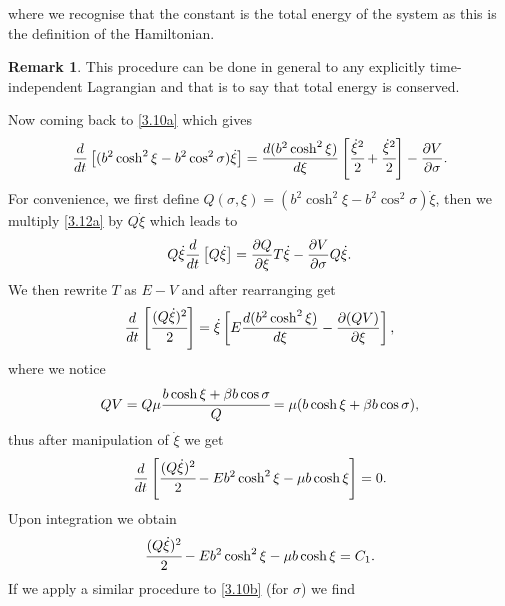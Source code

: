 \documentclass[12pt,oneside]{report}
\theoremstyle{definition}
\newtheorem{remark}{Remark}
\begin{document}
where we recognise that the constant is the total energy of the system as this is the definition of the Hamiltonian.
\begin{remark}
 This procedure can be done in general to any explicitly time-independent Lagrangian and that is to say that total energy is conserved.   
\end{remark}
Now coming back to  \autoref{3.10a} which gives
    \begin{equation}\label{3.12a}
        \displaystyle\frac{d }{d t}\left[(b^{2}\cosh^{2}{\xi}-b^{2}\cos^{2}{\sigma})\dot{\xi} \right] = \displaystyle\frac{d (b^{2}\cosh^{2}{\xi})}{d \xi} \left[\cfrac{\dot{\xi}^{2}}{2} + \cfrac{\dot{\xi}^{2}}{2}\right] - \displaystyle\frac{\partial V}{\partial \sigma} .
    \end{equation}
For convenience, we first define $ Q(\sigma,\xi) = (b^{2}\cosh^{2}{\xi}-b^{2}\cos^{2}{\sigma})\dot{\xi}$, then we multiply \autoref{3.12a} by $ Q\dot{\xi} $ which leads to
$$ Q\dot{\xi} \displaystyle\frac{d }{d t}\left[Q\dot{\xi} \right] = \displaystyle\frac{\partial Q}{\partial \xi} T \dot{\xi} - \displaystyle\frac{\partial V}{\partial \sigma} Q\dot{\xi}  .$$
We then rewrite $T$ as $E-V$ and after rearranging  get
$$ \displaystyle\frac{d }{d t} \left[ \cfrac{(Q\dot{\xi})^{2}}{2} \right] = \dot{\xi} \left[E\displaystyle\frac{d (b^{2}\cosh^{2}{\xi})}{d \xi} - \displaystyle\frac{\partial (QV)}{\partial \xi} \right],$$
where we notice
$$ QV = Q \mu\cfrac{b\cosh{\xi} + \beta b \cos{\sigma}}{Q} = \mu (b\cosh{\xi} + \beta b \cos{\sigma}), $$
thus after manipulation of $\dot{\xi}$ we get
$$ 
    \displaystyle\frac{d }{d t} \left[ \cfrac{(Q\dot{\xi})^{2}}{2} - Eb^{2}\cosh^{2}{\xi} -\mu b \cosh{\xi} \right] = 0.
$$
Upon integration we obtain
\begin{equation}\label{3.13}
    \cfrac{(Q\dot{\xi})^{2}}{2} - Eb^{2}\cosh^{2}{\xi} -\mu b \cosh{\xi} = C_{1}.
\end{equation}
If we apply a similar procedure to \autoref{3.10b} (for $\sigma$) we find
\end{document}
